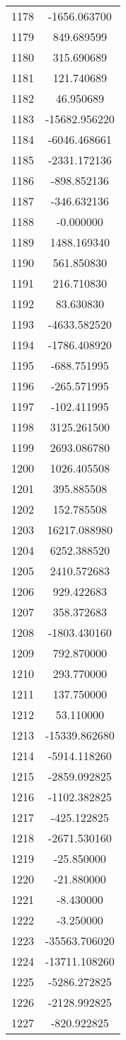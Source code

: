 \documentclass[12pt]{article}
\begin{document}
\begin{longtable}{@{}cc@{}}
1178 & -1656.063700 \\
1179 & 849.689599 \\
1180 & 315.690689 \\
1181 & 121.740689 \\
1182 & 46.950689 \\
1183 & -15682.956220 \\
1184 & -6046.468661 \\
1185 & -2331.172136 \\
1186 & -898.852136 \\
1187 & -346.632136 \\
1188 & -0.000000 \\
1189 & 1488.169340 \\
1190 & 561.850830 \\
1191 & 216.710830 \\
1192 & 83.630830 \\
1193 & -4633.582520 \\
1194 & -1786.408920 \\
1195 & -688.751995 \\
1196 & -265.571995 \\
1197 & -102.411995 \\
1198 & 3125.261500 \\
1199 & 2693.086780 \\
1200 & 1026.405508 \\
1201 & 395.885508 \\
1202 & 152.785508 \\
1203 & 16217.088980 \\
1204 & 6252.388520 \\
1205 & 2410.572683 \\
1206 & 929.422683 \\
1207 & 358.372683 \\
1208 & -1803.430160 \\
1209 & 792.870000 \\
1210 & 293.770000 \\
1211 & 137.750000 \\
1212 & 53.110000 \\
1213 & -15339.862680 \\
1214 & -5914.118260 \\
1215 & -2859.092825 \\
1216 & -1102.382825 \\
1217 & -425.122825 \\
1218 & -2671.530160 \\
1219 & -25.850000 \\
1220 & -21.880000 \\
1221 & -8.430000 \\
1222 & -3.250000 \\
1223 & -35563.706020 \\
1224 & -13711.108260 \\
1225 & -5286.272825 \\
1226 & -2128.992825 \\
1227 & -820.922825 \\

\end{longtable}
\end{document}
